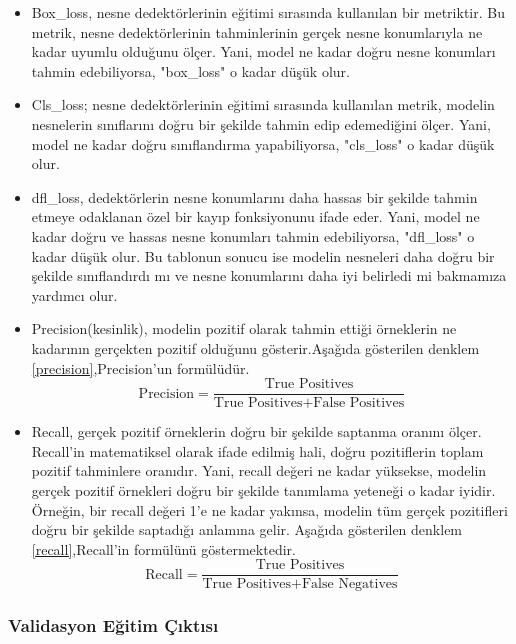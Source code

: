 \documentclass[]{article}
\begin{document}
		\begin{itemize}
			\item Box\_loss, nesne dedektörlerinin eğitimi sırasında kullanılan bir metriktir. Bu metrik, nesne dedektörlerinin tahminlerinin gerçek nesne konumlarıyla ne kadar uyumlu olduğunu ölçer. Yani, model ne kadar doğru nesne konumları tahmin edebiliyorsa, "box\_loss" o kadar düşük olur.
			\item Cls\_loss; nesne dedektörlerinin eğitimi sırasında kullanılan metrik, modelin nesnelerin sınıflarını doğru bir şekilde tahmin edip edemediğini ölçer. Yani, model ne kadar doğru sınıflandırma yapabiliyorsa, "cls\_loss" o kadar düşük olur.
			\item dfl\_loss, dedektörlerin nesne konumlarını daha hassas bir şekilde tahmin etmeye odaklanan özel bir kayıp fonksiyonunu ifade eder. Yani, model ne kadar doğru ve hassas nesne konumları tahmin edebiliyorsa, "dfl\_loss" o kadar düşük olur. Bu tablonun sonucu ise modelin nesneleri daha doğru bir şekilde sınıflandırdı mı ve nesne konumlarını daha iyi belirledi mi bakmamıza yardımcı olur.
			\item Precision(kesinlik), modelin pozitif olarak tahmin ettiği örneklerin ne kadarının gerçekten pozitif olduğunu gösterir.Aşağıda gösterilen denklem \ref{precision},Precision'un formülüdür.
			\begin{equation}
				 \text{Precision} = \frac{\text{True Positives}}{\text{True Positives} + \text{False Positives}}
				 \label{precision}
			\end{equation}
			\item Recall, gerçek pozitif örneklerin doğru bir şekilde saptanma oranını ölçer. Recall'in matematiksel olarak ifade edilmiş hali, doğru pozitiflerin toplam pozitif tahminlere oranıdır. Yani, recall değeri ne kadar yüksekse, modelin gerçek pozitif örnekleri doğru bir şekilde tanımlama yeteneği o kadar iyidir. Örneğin, bir recall değeri 1'e ne kadar yakınsa, modelin tüm gerçek pozitifleri doğru bir şekilde saptadığı anlamına gelir. Aşağıda gösterilen denklem \ref{recall},Recall'in formülünü göstermektedir.
			\begin{equation}
				\text{Recall} = \frac{\text{True Positives}}{\text{True Positives} + \text{False Negatives}}
				\label{recall}
			\end{equation}
		\end{itemize}
	\newpage
	\subsubsection{Validasyon Eğitim Çıktısı}
\end{document}
